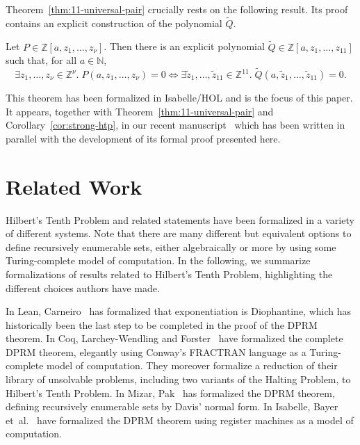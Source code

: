 \documentclass[a4paper,USenglish,cleveref,autoref,thm-restate]{lipics-v2021}
\newcommand{\N}{{\mathbb N}}
\newcommand{\Z}{{\mathbb Z}}
\begin{document}
Theorem~\ref{thm:11-universal-pair} crucially rests on the following result. Its proof contains an explicit construction of the polynomial $\tilde Q$. 

\begin{theorem}\label{thm:11-unknowns}  
    Let $P \in \Z[a, z_1, \ldots, z_\nu]$. Then there is an explicit polynomial $\tilde Q \in \Z[a, z_1, \ldots, z_{11}]$ such that, for all $a \in \N$,
    \[
        \exists z_1, \ldots, z_\nu \in \Z^\nu. \; P(a, z_1, \ldots, z_\nu) = 0 \iff \exists \tilde z_1, \ldots, \tilde z_{11} \in \Z^{11}. \; \tilde Q(a, \tilde z_1, \ldots, \tilde z_{11}) = 0.
    \]
\end{theorem}

This theorem has been formalized in Isabelle/HOL and is the focus of this paper. It appears, together with Theorem~\ref{thm:11-universal-pair} and Corollary~\ref{cor:strong-htp}, in our recent manuscript~\cite{manuscript} which has been written in parallel with the development of its formal proof presented here.

\section{Related Work}
Hilbert's Tenth Problem and related statements have been formalized in a variety of different systems. Note that there are many different but equivalent options to define recursively enumerable sets, either algebraically or more by using some Turing-complete model of computation. In the following, we summarize formalizations of results related to Hilbert's Tenth Problem, highlighting the different choices authors have made.

In Lean, Carneiro~\cite{lean-formalization} has formalized that exponentiation is Diophantine, which has historically been the last step to be completed in the proof of the DPRM theorem. In Coq, Larchey-Wendling and Forster~\cite{coq-formalization} have formalized the complete DPRM theorem, elegantly using Conway's FRACTRAN language as a Turing-complete model of computation. They moreover formalize a reduction of their library of unsolvable problems, including two variants of the Halting Problem, to Hilbert's Tenth Problem. In Mizar, Pak~\cite{mizar-formalization} has formalized the DPRM theorem, defining recursively enumerable sets by Davis' normal form. In Isabelle, Bayer et~al.~\cite{isabelle-formalization} have formalized the DPRM theorem using register machines as a model of computation.

\medskip
\end{document}
